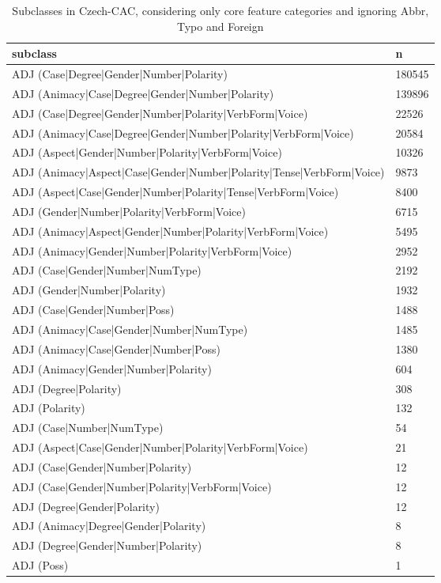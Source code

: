 \documentclass[USenglish]{article}
\begin{document}
\begin{table}[ht]
    \centering
    \caption{Subclasses in Czech-CAC, considering only core feature categories and ignoring Abbr, Typo and Foreign} %
    \label{tab:czech_cac_subclass_table}  
    {\small
    \begin{tabular}{p{9.5cm}p{1cm}}
\toprule
	\textbf{subclass}	&	\textbf{n}	\\	\midrule
ADJ (Case|Degree|Gender|Number|Polarity)	&	180545	\\ \midrule
ADJ (Animacy|Case|Degree|Gender|Number|Polarity)	&	139896	\\ \midrule
ADJ (Case|Degree|Gender|Number|Polarity|VerbForm|Voice)	&	22526	\\ \midrule
ADJ (Animacy|Case|Degree|Gender|Number|Polarity|VerbForm|Voice)	&	20584	\\ \midrule
ADJ (Aspect|Gender|Number|Polarity|VerbForm|Voice)	&	10326	\\ \midrule
ADJ (Animacy|Aspect|Case|Gender|Number|Polarity|Tense|VerbForm|Voice)	&	9873	\\ \midrule
ADJ (Aspect|Case|Gender|Number|Polarity|Tense|VerbForm|Voice)	&	8400	\\ \midrule
ADJ (Gender|Number|Polarity|VerbForm|Voice)	&	6715	\\ \midrule
ADJ (Animacy|Aspect|Gender|Number|Polarity|VerbForm|Voice)	&	5495	\\ \midrule
ADJ (Animacy|Gender|Number|Polarity|VerbForm|Voice)	&	2952	\\ \midrule
ADJ (Case|Gender|Number|NumType)	&	2192	\\ \midrule
ADJ (Gender|Number|Polarity)	&	1932	\\ \midrule
ADJ (Case|Gender|Number|Poss)	&	1488	\\ \midrule
ADJ (Animacy|Case|Gender|Number|NumType)	&	1485	\\ \midrule
ADJ (Animacy|Case|Gender|Number|Poss)	&	1380	\\ \midrule
ADJ (Animacy|Gender|Number|Polarity)	&	604	\\ \midrule
ADJ (Degree|Polarity)	&	308	\\ \midrule
ADJ (Polarity)	&	132	\\ \midrule
ADJ (Case|Number|NumType)	&	54	\\ \midrule
ADJ (Aspect|Case|Gender|Number|Polarity|VerbForm|Voice)	&	21	\\ \midrule
ADJ (Case|Gender|Number|Polarity)	&	12	\\ \midrule
ADJ (Case|Gender|Number|Polarity|VerbForm|Voice)	&	12	\\ \midrule
ADJ (Degree|Gender|Polarity)	&	12	\\ \midrule
ADJ (Animacy|Degree|Gender|Polarity)	&	8	\\ \midrule
ADJ (Degree|Gender|Number|Polarity)	&	8	\\ \midrule
ADJ (Poss)	&	1	\\ \bottomrule
    
    \end{tabular}
    }
\end{table}
\end{document}
